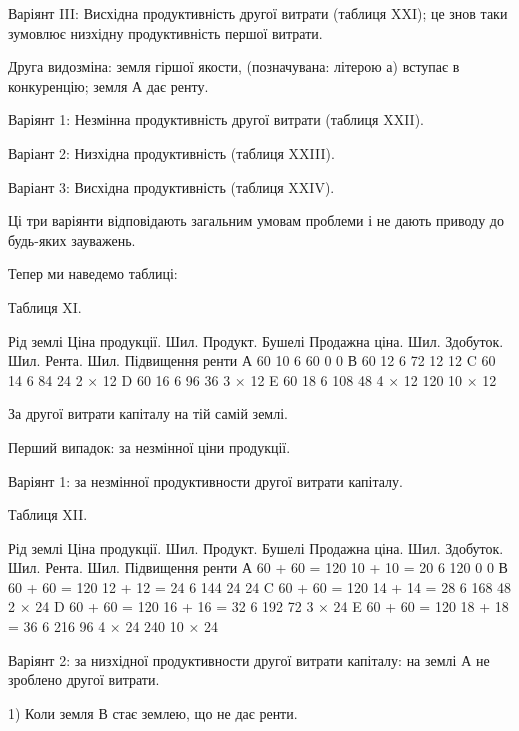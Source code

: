 Варіянт III: Висхідна продуктивність другої витрати (таблиця XXI); це знов
таки зумовлює низхідну продуктивність першої витрати.

Друга видозміна: земля гіршої якости, (позначувана: літерою а)
вступає в конкуренцію; земля А дає ренту.

Варіянт 1: Незмінна продуктивність другої витрати (таблиця XXII).

Варіант 2: Низхідна продуктивність (таблиця XXIII).

Варіант 3: Висхідна продуктивність (таблиця XXIV).

Ці три варіянти відповідають загальним умовам проблеми і не дають
приводу до будь-яких зауважень.

Тепер ми наведемо таблиці:

Таблиця XI.

Рід землі
Ціна продукції. Шил.
Продукт. Бушелі
Продажна ціна. Шил.
Здобуток. Шил.
Рента. Шил.
Підвищення ренти
А 60 10 6 60 0          0
В 60 12 6 72 12       12
C 60 14 6 84 24  2 × 12
D 60 16 6 96 36  3 × 12
E 60 18 6 108 48  4 × 12
120                        10 × 12

За другої витрати капіталу на тій самій землі.

Перший випадок: за незмінної ціни продукції.

Варіянт 1: за незмінної продуктивности другої витрати капіталу.

Таблиця XII.

Рід землі
Ціна продукції. Шил.
Продукт. Бушелі
Продажна ціна. Шил.
Здобуток. Шил.
Рента. Шил.
Підвищення ренти
А 60 + 60 = 120 10 + 10 = 20 6 120 0 0
В 60 + 60 = 120 12 + 12 = 24 6 144 24 24
C 60 + 60 = 120 14 + 14 = 28 6 168 48 2 × 24
D 60 + 60 = 120 16 + 16 = 32 6 192 72 3 × 24
E 60 + 60 = 120 18 + 18 = 36 6 216 96 4 × 24
240 10 × 24

Варіянт 2: за низхідної продуктивности другої витрати капіталу: на землі
А не зроблено другої витрати.

1) Коли земля В стає землею, що не дає ренти.
